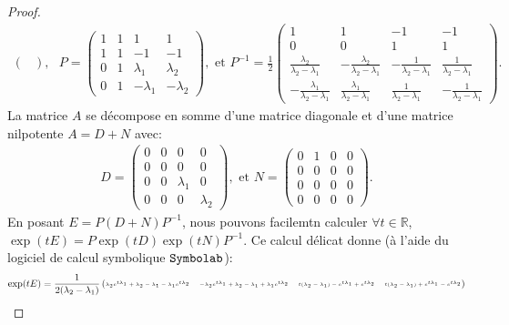 \begin{proof}
\begin{align*}
\begin{pmatrix}
    \end{pmatrix}, \text{  } P = \begin{pmatrix}
        1 & 1 & 1 & 1 \\ 1 & 1 & -1 & -1 \\ 0 & 1 & \lambda_1 & \lambda_2 \\ 0 & 1 & -\lambda_1 & -\lambda_2
    \end{pmatrix}, \text{ et } P^{-1} = \frac{1}{2}\begin{pmatrix}
        1 & 1 & -1 & -1 \\ 0 & 0 & 1 & 1 \\ \frac{\lambda_2}{\lambda_2-\lambda_1} & -\frac{\lambda_2}{\lambda_2-\lambda_1} & -\frac{1}{\lambda_2-\lambda_1} & \frac{1}{\lambda_2-\lambda_1} \\ -\frac{\lambda_1}{\lambda_2-\lambda_1} & \frac{\lambda_1}{\lambda_2-\lambda_1} & \frac{1}{\lambda_2-\lambda_1} & -\frac{1}{\lambda_2-\lambda_1}
    \end{pmatrix}.
\end{align*}
La matrice $A$ se décompose en somme d'une matrice diagonale et d'une matrice nilpotente $A = D+N$ avec:
\begin{align*}
    D = \begin{pmatrix}
        0 & 0 & 0 & 0 \\ 0 & 0 & 0 & 0 \\ 0 & 0 & \lambda_1 & 0 \\ 0 & 0 & 0 & \lambda_2
    \end{pmatrix}, \text{ et } N = \begin{pmatrix}
        0 & 1 & 0 & 0 \\ 0 & 0 & 0 & 0 \\ 0 & 0 & 0 & 0 \\ 0 & 0 & 0 & 0
    \end{pmatrix}.
\end{align*}
En posant $E = P(D+N)P^{-1}$, nous pouvons facilemtn calculer $\forall t \in \mathbb{R}$, $\exp(tE) = P\exp(tD)\exp(tN)P^{-1}$. Ce calcul délicat donne (à l'aide du logiciel de calcul symbolique $\verb|Symbolab|$):
\begin{align*}
    \exp(tE) = \tiny \frac{1}{2(\lambda_2 - \lambda_1)}\begin{pmatrix} 
        \lambda_2e^{t\lambda_1} + \lambda_2 - \lambda_1 - \lambda_1e^{t\lambda_2} & -\lambda_2e^{t\lambda_1} + \lambda_2 - \lambda_1 + \lambda_1e^{t\lambda_2} & t(\lambda_2 -\lambda_1) - e^{t\lambda_1} + e^{t\lambda_2} & t(\lambda_2 -\lambda_1) + e^{t\lambda_1} - e^{t\lambda_2} \\

\end{pmatrix}
\end{align*}
\end{proof}
